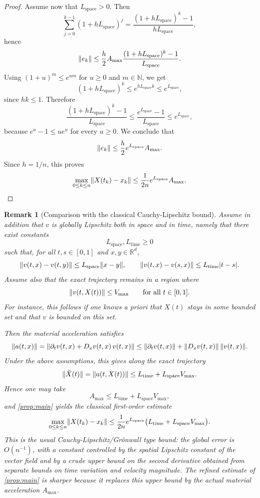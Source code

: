 \documentclass[11pt]{article}
\newtheorem{remark}{Remark}
\DeclarePairedDelimiter{\norm}{\lVert}{\rVert}
\begin{document}
\begin{proof}
Assume now that $L_{\mathrm{space}}>0$. Then
\[
\sum_{j=0}^{k-1}(1+hL_{\mathrm{space}})^j
=
\frac{(1+hL_{\mathrm{space}})^k-1}{hL_{\mathrm{space}}},
\]
hence
\[
\norm{e_k}
\leq
\frac{h}{2}A_{\max}
\frac{(1+hL_{\mathrm{space}})^k-1}{L_{\mathrm{space}}}.
\]
Using $(1+u)^m\leq e^{um}$ for $u\geq 0$ and $m\in\mathbb{N}$, we get
\[
(1+hL_{\mathrm{space}})^k
\leq
e^{hL_{\mathrm{space}}k}
\leq
e^{L_{\mathrm{space}}},
\]
since $hk\leq 1$. Therefore
\[
\frac{(1+hL_{\mathrm{space}})^k-1}{L_{\mathrm{space}}}
\leq
\frac{e^{L_{\mathrm{space}}}-1}{L_{\mathrm{space}}}
\leq
e^{L_{\mathrm{space}}},
\]
because $e^u-1\leq ue^u$ for every $u\geq 0$. We conclude that
\[
\norm{e_k}\leq \frac{h}{2}e^{L_{\mathrm{space}}}A_{\max}.
\]
Since $h=1/n$, this proves
\[
\max_{0\leq k\leq n}\norm{X(t_k)-x_k}
\leq
\frac{1}{2n}e^{L_{\mathrm{space}}}A_{\max}.
\qedhere
\]
\end{proof}


\begin{remark}[Comparison with the classical Cauchy-Lipschitz bound]
Assume in addition that $v$ is globally Lipschitz both in space and in time, namely that there exist constants
\[
L_{\mathrm{space}},L_{\mathrm{time}}\geq 0
\]
such that, for all $t,s\in[0,1]$ and $x,y\in\mathbb{R}^d$,
\[
\norm{v(t,x)-v(t,y)}\leq L_{\mathrm{space}}\norm{x-y},
\qquad
\norm{v(t,x)-v(s,x)}\leq L_{\mathrm{time}}|t-s|.
\]
Assume also that the exact trajectory remains in a region where
\[
\norm{v(t,X(t))}\leq V_{\max}
\qquad\text{for all }t\in[0,1].
\]
For instance, this follows if one knows a priori that $X(t)$ stays in some bounded set and that $v$ is bounded on this set.

Then the material acceleration satisfies
\[
\norm{a(t,x)}
=
\norm{\partial_t v(t,x)+D_xv(t,x)\,v(t,x)}
\leq
\norm{\partial_t v(t,x)}+\norm{D_xv(t,x)}\,\norm{v(t,x)}.
\]
Under the above assumptions, this gives along the exact trajectory
\[
\norm{\ddot X(t)}
=
\norm{a(t,X(t))}
\leq
L_{\mathrm{time}}+L_{\mathrm{space}}V_{\max}.
\]
Hence one may take
\[
A_{\max}\leq L_{\mathrm{time}}+L_{\mathrm{space}}V_{\max},
\]
and \cref{prop:main} yields the classical first-order estimate
\[
\max_{0\leq k\leq n}\norm{X(t_k)-x_k}
\leq
\frac{1}{2n}e^{L_{\mathrm{space}}}\bigl(L_{\mathrm{time}}+L_{\mathrm{space}}V_{\max}\bigr).
\]
This is the usual Cauchy-Lipschitz/Gr\"onwall type bound: the global error is $O(n^{-1})$, with a constant controlled by the spatial Lipschitz constant of the vector field and by a crude upper bound on the second derivative obtained from separate bounds on time variation and velocity magnitude. The refined estimate of \cref{prop:main} is sharper because it replaces this upper bound by the actual material acceleration $A_{\max}$.
\end{remark}
\end{document}

